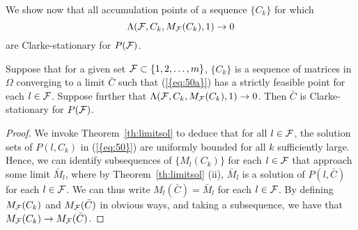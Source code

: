 \documentclass{siamltex}
\begin{document}
We show now that all accumulation points of a sequence $\{ C_k \}$ for
which 
\[
\Lambda({{\cal F}},C_k,M_{{\cal F}}(C_k),1) \to 0
\]
are Clarke-stationary for $P({{\cal F}})$.
\begin{theorem} \label{th:stat} Suppose that for a given set ${{\cal F}}
  \subset \{1,2,\dotsc,m\}$, $\{ C_k \}$ is a sequence of matrices in
  $\Omega$ converging to a limit $\bar{C}$ such that {(\ref{{eq:50a}})}
  has a strictly feasible point for each $l \in {{\cal F}}$. Suppose further
  that $\Lambda ({{\cal F}},C_k,M_{{\cal F}}(C_k),1) \to 0$. Then $\bar{C}$ is
  Clarke-stationary for $P({{\cal F}})$.
\end{theorem}
\begin{proof}
  We invoke Theorem~\ref{th:limitsol} to deduce that for all $l \in
  {{\cal F}}$, the solution sets of $P(l,C_k)$ in {(\ref{{eq:50}})} are uniformly
  bounded for all $k$ sufficiently large. Hence, we can identify
  subsequences of $\{ M_l(C_k) \}$ for each $l \in {{\cal F}}$ that approach
  some limit $\bar{M}_l$, where by Theorem~\ref{th:limitsol} (ii),
  $\bar{M}_l$ is a solution of $P(l,\bar{C})$ for each $l \in {{\cal F}}$. We
  can thus write $M_l(\bar{C}) = \bar{M}_l$ for each $l \in {{\cal F}}$. By
  defining $M_{{\cal F}}(C_k)$ and $M_{{\cal F}}(\bar{C})$ in obvious ways, and
  taking a subsequence, we have that $M_{{\cal F}}(C_k) \to
  M_{{\cal F}}(\bar{C})$.


\end{proof}
\end{document}
